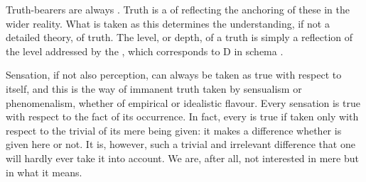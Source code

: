 Truth-bearers are always .
Truth is a  of  reflecting the anchoring of these in
the wider reality. What is taken as this  determines the
understanding, if not a detailed theory, of truth.  The level, or depth, of a
truth is simply a reflection of the level addressed by the , which
corresponds to D in schema .


\label{pa:levelAtruth}\label{pa:immedSubject}
Sensation, if not also perception, can always be taken as true with respect to
itself, and this is the way of immanent truth taken by sensualism or
phenomenalism, whether of empirical or idealistic flavour. Every sensation is
true with respect to the fact of its occurrence.  In fact, every  is
true if taken only with respect to the trivial  of its mere
being given: it makes a difference whether  is given here or not. It
is, however, such a trivial and irrelevant difference that one will hardly ever
take it into account. We are, after all, not interested in mere 
but in what it means.

